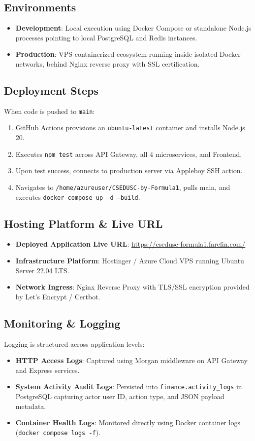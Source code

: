 \documentclass[12pt, a4paper]{article}
\begin{document}
\subsection{Environments}
\begin{itemize}
    \item \textbf{Development}: Local execution using Docker Compose or standalone Node.js processes pointing to local PostgreSQL and Redis instances.
    \item \textbf{Production}: VPS containerized ecosystem running inside isolated Docker networks, behind Nginx reverse proxy with SSL certification.
\end{itemize}

\subsection{Deployment Steps}
When code is pushed to \texttt{main}:
\begin{enumerate}
    \item GitHub Actions provisions an \texttt{ubuntu-latest} container and installs Node.js 20.
    \item Executes \texttt{npm test} across API Gateway, all 4 microservices, and Frontend.
    \item Upon test success, connects to production server via Appleboy SSH action.
    \item Navigates to \texttt{/home/azureuser/CSEDUSC-by-Formula1}, pulls main, and executes \texttt{docker compose up -d --build}.
\end{enumerate}

\subsection{Hosting Platform \& Live URL}
\begin{itemize}
    \item \textbf{Deployed Application Live URL}: \url{https://csedusc-formula1.farefin.com/}
    \item \textbf{Infrastructure Platform}: Hostinger / Azure Cloud VPS running Ubuntu Server 22.04 LTS.
    \item \textbf{Network Ingress}: Nginx Reverse Proxy with TLS/SSL encryption provided by Let's Encrypt / Certbot.
\end{itemize}

\subsection{Monitoring \& Logging}
Logging is structured across application levels:
\begin{itemize}
    \item \textbf{HTTP Access Logs}: Captured using Morgan middleware on API Gateway and Express services.
    \item \textbf{System Activity Audit Logs}: Persisted into \texttt{finance.activity\_logs} in PostgreSQL capturing actor user ID, action type, and JSON payload metadata.
    \item \textbf{Container Health Logs}: Monitored directly using Docker container logs (\texttt{docker compose logs -f}).
\end{itemize}
\end{document}
